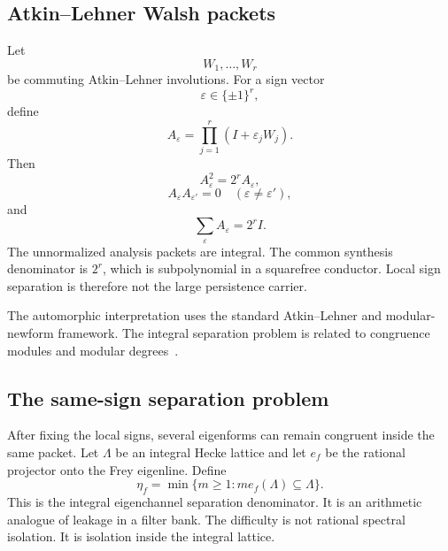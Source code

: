 \subsection{Atkin--Lehner Walsh packets}
Let
\[
 W_1,\ldots,W_r
\]
be commuting Atkin--Lehner involutions. For a sign vector
\[
 \varepsilon\in\{\pm1\}^r,
\]
define
\[
 A_\varepsilon
 =
 \prod_{j=1}^{r}(I+\varepsilon_jW_j).
\]
Then
\[
 \boxed{
 A_\varepsilon^2=2^rA_\varepsilon,
 }
\]
\[
 A_\varepsilon A_{\varepsilon'}=0
 \quad(\varepsilon\neq\varepsilon'),
\]
and
\[
 \boxed{
 \sum_\varepsilon A_\varepsilon=2^rI.
 }
\]
The unnormalized analysis packets are integral. The common synthesis denominator is $2^r$, which is subpolynomial in a squarefree conductor. Local sign separation is therefore not the large persistence carrier.

The automorphic interpretation uses the standard Atkin--Lehner and modular-newform framework. The integral separation problem is related to congruence modules and modular degrees~\cite{Wiles,TaylorWiles,BCDT,Agashe,CesnaviciusManin}.

\subsection{The same-sign separation problem}
After fixing the local signs, several eigenforms can remain congruent inside the same packet. Let $\Lambda$ be an integral Hecke lattice and let $e_f$ be the rational projector onto the Frey eigenline. Define
\[
 \eta_f
 =
 \min\{m\ge1:m e_f(\Lambda)\subseteq\Lambda\}.
\]
This is the integral eigenchannel separation denominator. It is an arithmetic analogue of leakage in a filter bank. The difficulty is not rational spectral isolation. It is isolation inside the integral lattice.

